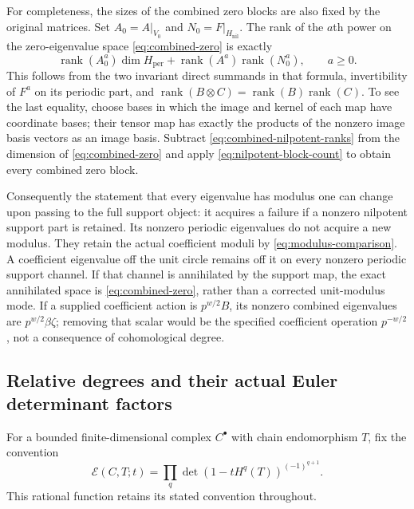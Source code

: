 For completeness, the sizes of the combined zero blocks are also
fixed by the original matrices. Set $A_0=A|_{V_0}$ and
$N_0=F|_{H_{\mathrm{nil}}}$. The rank of the $a$th power on the
zero-eigenvalue space \eqref{eq:combined-zero} is exactly
\[
 \operatorname{rank}(A_0^a)\dim H_{\mathrm{per}}
  +\operatorname{rank}(A^a)\operatorname{rank}(N_0^a),
 \qquad a\ge0.
 \tag{SE12a}\label{eq:combined-nilpotent-ranks}
\]
This follows from the two invariant direct summands in that formula,
invertibility of $F^a$ on its periodic part, and
$\operatorname{rank}(B\otimes C)=\operatorname{rank}(B)
\operatorname{rank}(C)$. To see the last equality, choose bases in
which the image and kernel of each map have coordinate bases;
their tensor map has exactly the products of the nonzero image basis
vectors as an image basis. Subtract
\eqref{eq:combined-nilpotent-ranks} from the dimension of
\eqref{eq:combined-zero} and apply
\eqref{eq:nilpotent-block-count} to obtain every combined zero block.

Consequently the statement that every eigenvalue has modulus one can
change upon passing to the full support object: it acquires a failure
if a nonzero nilpotent support part is retained. Its nonzero periodic
eigenvalues do not acquire a new modulus. They retain the actual
coefficient moduli by \eqref{eq:modulus-comparison}. A coefficient
eigenvalue off the unit circle remains off it on every nonzero
periodic support channel. If that channel is annihilated by the
support map, the exact annihilated space is
\eqref{eq:combined-zero}, rather than a corrected unit-modulus mode.
If a supplied coefficient action is $p^{w/2}B$, its nonzero combined
eigenvalues are $p^{w/2}\beta\zeta$; removing that scalar would be
the specified coefficient operation $p^{-w/2}$, not a consequence
of cohomological degree.

\subsection{Relative degrees and their actual Euler determinant factors}

For a bounded finite-dimensional complex $C^\bullet$ with chain
endomorphism $T$, fix the convention
\[
 \mathcal E(C,T;t)=
 \prod_q\det(1-tH^q(T))^{(-1)^{q+1}}.
 \tag{SE14}\label{eq:euler-determinant}
\]
This rational function retains its stated convention throughout.

